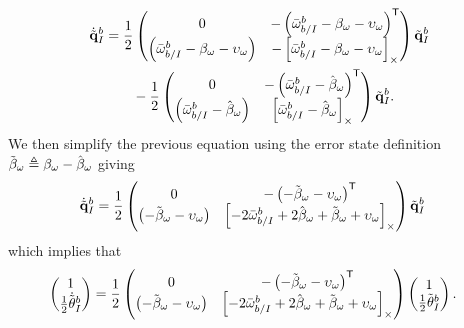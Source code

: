 \begin{align}
  \dot{\tilde{\mathrm{\mathbf{q}}}}_I^b &=
  \frac{1}{2}
  \begin{pmatrix}
    0 & -\left( \bar{\mathrm{\mathbf{\omega}}}_{b/I}^b - \mathrm{\mathbf{\beta}}_\omega -
      \mathrm{\mathbf{\upsilon}}_\omega
    \right)^{\mathsf{T}} \\
      \left( \bar{\mathrm{\mathbf{\omega}}}_{b/I}^b - \mathrm{\mathbf{\beta}}_\omega -
    \mathrm{\mathbf{\upsilon}}_\omega \right) &
    -\left[ \bar{\mathrm{\mathbf{\omega}}}_{b/I}^b - \mathrm{\mathbf{\beta}}_\omega -
    \mathrm{\mathbf{\upsilon}}_\omega  \right]_{\times}
  \end{pmatrix}
  \tilde{\mathrm{\mathbf{q}}}_I^b \\
                       & \qquad - \frac{1}{2}
  \begin{pmatrix}
    0 & -\left( \bar{\mathrm{\mathbf{\omega}}}_{b/I}^b - \hat{\mathrm{\mathbf{\beta}}}_\omega
    \right)^{\mathsf{T}} \\
      \left( \bar{\mathrm{\mathbf{\omega}}}_{b/I}^b - \hat{\mathrm{\mathbf{\beta}}}_\omega \right) &
      \left[ \bar{\mathrm{\mathbf{\omega}}}_{b/I}^b - \hat{\mathrm{\mathbf{\beta}}}_\omega  \right]_{\times}
  \end{pmatrix}
  \tilde{\mathrm{\mathbf{q}}}_I^b.
  \nonumber
\end{align}
We then simplify the previous equation using the error state definition
$\tilde{\mathrm{\mathbf{\beta}}}_\omega \triangleq \mathrm{\mathbf{\beta}}_\omega -
\hat{\mathrm{\mathbf{\beta}}}_\omega$ giving
\begin{align}
  \dot{\tilde{\mathrm{\mathbf{q}}}}_I^b &=
  \frac{1}{2}
  \begin{pmatrix}
    0 & -\left( - \tilde{\mathrm{\mathbf{\beta}}}_\omega -
      \mathrm{\mathbf{\upsilon}}_\omega
    \right)^{\mathsf{T}} \\
    \left( - \tilde{\mathrm{\mathbf{\beta}}}_\omega -
    \mathrm{\mathbf{\upsilon}}_\omega \right) &
    \left[  -2\bar{\mathrm{\mathbf{\omega}}}_{b/I}^b + 2\hat{\mathrm{\mathbf{\beta}}}_\omega
      + \tilde{\mathrm{\mathbf{\beta}}}_\omega + \mathrm{\mathbf{\upsilon}}_\omega  \right]_{\times}
  \end{pmatrix}
  \tilde{\mathrm{\mathbf{q}}}_I^b
\end{align}
which implies that
\begin{align}
  \begin{pmatrix}
    1 \\
    \frac{1}{2} \dot{\tilde{\mathrm{\mathbf{\theta}}}}_I^b
  \end{pmatrix}
  &=
  \frac{1}{2}
  \begin{pmatrix}
    0 & -\left( - \tilde{\mathrm{\mathbf{\beta}}}_\omega -
      \mathrm{\mathbf{\upsilon}}_\omega
    \right)^{\mathsf{T}} \\
    \left( - \tilde{\mathrm{\mathbf{\beta}}}_\omega -
    \mathrm{\mathbf{\upsilon}}_\omega \right) &
    \left[  -2\bar{\mathrm{\mathbf{\omega}}}_{b/I}^b + 2\hat{\mathrm{\mathbf{\beta}}}_\omega
      + \tilde{\mathrm{\mathbf{\beta}}}_\omega + \mathrm{\mathbf{\upsilon}}_\omega  \right]_{\times}
  \end{pmatrix}
  \begin{pmatrix}
    1 \\
    \frac{1}{2} \tilde{\mathrm{\mathbf{\theta}}}_I^b
  \end{pmatrix}.
\end{align}
